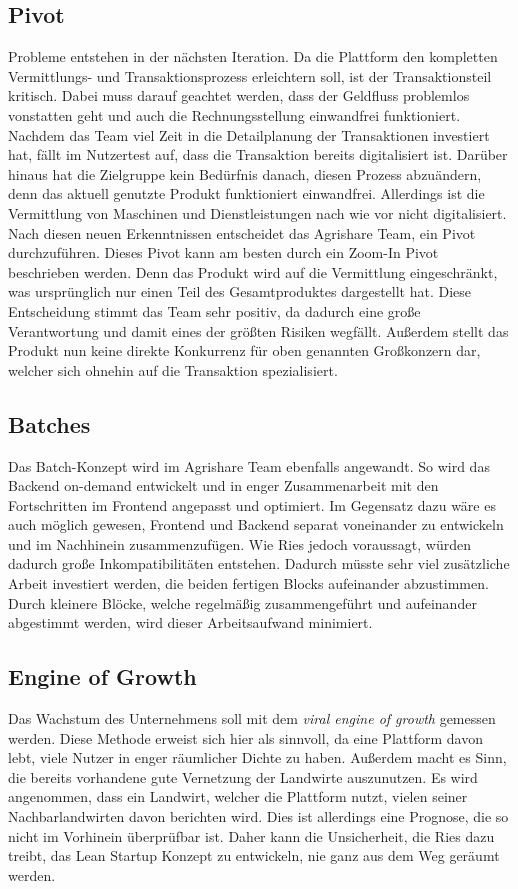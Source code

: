 \subsection*{Pivot}
Probleme entstehen in der nächsten Iteration. Da die Plattform den kompletten Vermittlungs- und Transaktionsprozess erleichtern soll, ist der Transaktionsteil kritisch. Dabei muss darauf geachtet werden, dass der Geldfluss problemlos vonstatten geht und auch die Rechnungsstellung einwandfrei funktioniert. Nachdem das Team viel Zeit in die Detailplanung der Transaktionen investiert hat, fällt im Nutzertest auf, dass die Transaktion bereits digitalisiert ist. Darüber hinaus hat die Zielgruppe kein Bedürfnis danach, diesen Prozess abzuändern, denn das aktuell genutzte Produkt funktioniert einwandfrei. Allerdings ist die Vermittlung von Maschinen und Dienstleistungen nach wie vor nicht digitalisiert. Nach diesen neuen Erkenntnissen entscheidet das Agrishare Team, ein Pivot durchzuführen. Dieses Pivot kann am besten durch ein Zoom-In Pivot beschrieben werden. Denn das Produkt wird auf die Vermittlung eingeschränkt, was ursprünglich nur einen Teil des Gesamtproduktes dargestellt hat. Diese Entscheidung stimmt das Team sehr positiv, da dadurch eine große Verantwortung und damit eines der größten Risiken wegfällt. Außerdem stellt das Produkt nun keine direkte Konkurrenz für oben genannten Großkonzern dar, welcher sich ohnehin auf die Transaktion spezialisiert.

\subsection*{Batches}
Das Batch-Konzept wird im Agrishare Team ebenfalls angewandt. So wird das Backend on-demand entwickelt und in enger Zusammenarbeit mit den Fortschritten im Frontend angepasst und optimiert. Im Gegensatz dazu wäre es auch möglich gewesen, Frontend und Backend separat voneinander zu entwickeln und im Nachhinein zusammenzufügen. Wie Ries jedoch voraussagt, würden dadurch große Inkompatibilitäten entstehen. Dadurch müsste sehr viel zusätzliche Arbeit investiert werden, die beiden fertigen Blocks aufeinander abzustimmen. Durch kleinere Blöcke, welche regelmäßig zusammengeführt und aufeinander abgestimmt werden, wird dieser Arbeitsaufwand minimiert.

\subsection*{Engine of Growth}
Das Wachstum des Unternehmens soll mit dem \textit{viral engine of growth} gemessen werden. Diese Methode erweist sich hier als sinnvoll, da eine Plattform davon lebt, viele Nutzer in enger räumlicher Dichte zu haben. Außerdem macht es Sinn, die bereits vorhandene gute Vernetzung der Landwirte auszunutzen. Es wird angenommen, dass ein Landwirt, welcher die Plattform nutzt, vielen seiner Nachbarlandwirten davon berichten wird. Dies ist allerdings eine Prognose, die so nicht im Vorhinein überprüfbar ist. Daher kann die Unsicherheit, die Ries dazu treibt, das Lean Startup Konzept zu entwickeln, nie ganz aus dem Weg geräumt werden.

